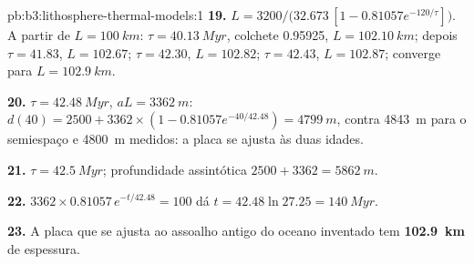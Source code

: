 \begin{solution}{pb:b3:lithosphere-thermal-models:1}
\textbf{19.} $L = 3200/\bigl(32.673\,[1 - 0.81057e^{-120/\tau}]\bigr)$. A partir de
$L = \qty{100}{km}$: $\tau = \qty{40.13}{Myr}$, colchete 0.95925, $L =
\qty{102.10}{km}$; depois $\tau = 41.83$, $L = 102.67$; $\tau = 42.30$, $L =
102.82$; $\tau = 42.43$, $L = 102.87$; converge para $L = \qty{102.9}{km}$.

\textbf{20.} $\tau = \qty{42.48}{Myr}$, $aL = \qty{3362}{m}$: $d(40) = 2500 +
3362\times(1 - 0.81057e^{-40/42.48}) = \qty{4799}{m}$, contra \qty{4843}{m}
para o semiespaço e \qty{4800}{m} medidos: a placa se ajusta às duas idades.

\textbf{21.} $\tau = \qty{42.5}{Myr}$; profundidade assintótica $2500 + 3362 =
\qty{5862}{m}$.

\textbf{22.} $3362\times0.81057\,e^{-t/42.48} = 100$ dá $t = 42.48\ln27.25 =
\qty{140}{Myr}$.

\textbf{23.} A placa que se ajusta ao assoalho antigo do oceano inventado
tem \textbf{\qty[text-series-to-math=true]{102.9}{km}} de espessura.
\end{solution}
